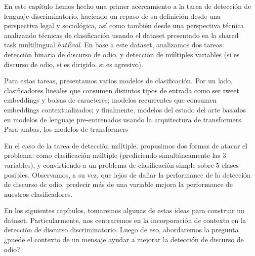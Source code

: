 En este capítulo hemos hecho una primer acercamiento a la tarea de detección de lenguaje discriminatorio, haciendo un repaso de su definición desde una perspectiva legal y sociológica, así como también desde una perspectiva técnica analizando técnicas de clasificación usando el dataset presentado en la shared task multilingual \emph{hatEval}\cite{hateval2019semeval}. En base a este dataset, analizamos dos tareas: detección binaria de discurso de odio, y detección de múltiples variables (si es discurso de odio, si es dirigido, si es agresivo).

Para estas tareas, presentamos varios modelos de clasificación. Por un lado, clasificadores lineales que consumen distintos tipos de entrada como ser tweet embeddings y bolsas de caracteres; modelos recurrentes que consumen embeddings contextualizados; y finalmente, modelos del estado del arte basados en modelos de lenguaje pre-entrenados usando la arquitectura de transformers. Para ambas, los modelos de transformers

En el caso de la tarea de detección múltiple, propusimos dos formas de atacar el problema: como clasificación múltiple (prediciendo simultáneamente las 3 variables), y convirtiendo a un problema de clasificación simple sobre 5 clases posibles. Observamos, a su vez, que lejos de dañar la performance de la detección de discurso de odio, predecir más de una variable mejora la performance de nuestros clasificadores.

En los siguientes capítulos, tomaremos algunas de estas ideas para construir un dataset. Particularmente, nos centraremos en la incorporación de contexto en la detección de discurso discriminatorio. Luego de eso, abordaremos la pregunta ¿puede el contexto de un mensaje ayudar a mejorar la detección de discurso de odio?